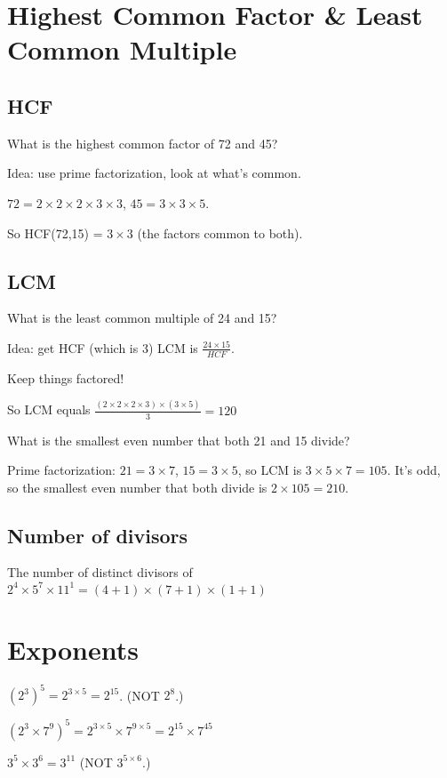 \documentclass[fullpage,twocolumn]{article}
\begin{document}
\section{
Highest Common Factor \& Least Common Multiple
}


\subsection{HCF}
What is the highest common factor of 72 and 45?

Idea: use prime factorization, look at what's common.

$72 = 2 \times 2 \times 2 \times 3 \times 3 $, $45 = 3 \times 3 \times 5$.

So HCF(72,15) = $ 3 \times 3 $ (the factors common to both).

\subsection{LCM}

What is the least common multiple of 24 and 15?

Idea:  get HCF (which is 3)
LCM is $\frac{24 \times 15}{HCF}$.

Keep things factored!

So LCM equals
$\frac{(2 \times 2 \times 2 \times 3) \times (3 \times 5)}{ 3} = 120$

What is the smallest even number that both 21 and 15 divide?

Prime factorization: $21 = 3 \times 7$, $15 = 3 \times 5$, so LCM is
$3 \times 5 \times 7 = 105$. It's odd, so the smallest even number
that both divide is $2 \times 105 = 210$.

\subsection{Number of divisors}

The number of distinct divisors of $2^4\times 5^7 \times 11^1 = (4+1)\times(7+1)\times(1+1)$

\section{Exponents}

$(2^3)^5 = 2^{3 \times 5} = 2^{15}$. (NOT $2^{8}$.)

$(2^3 \times 7^9)^5 = 2^{3 \times 5}  \times 7^{9 \times 5}= 2^{15} \times 7^{45}$

$3^5 \times 3^6 = 3^{11}$ (NOT $3^{5 \times 6}$.)
\end{document}

